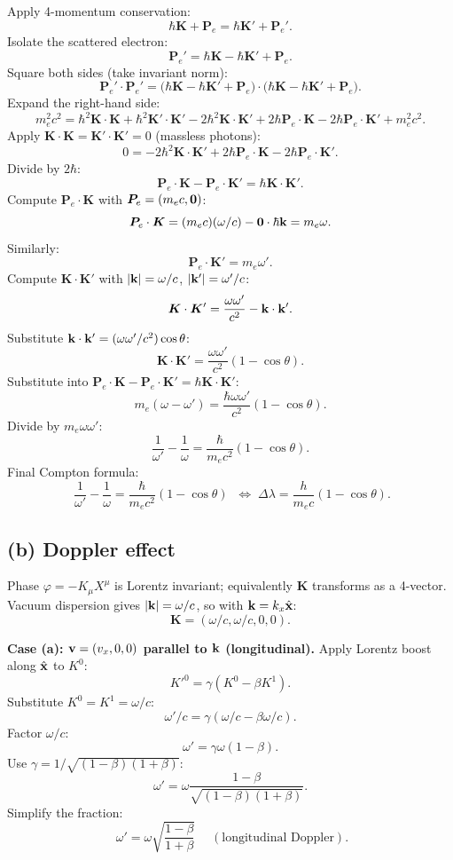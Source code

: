 \documentclass[11pt]{article}
\begin{document}
Apply 4-momentum conservation:
\[
\hbar\bm K + \bm P_e = \hbar\bm K' + \bm P_e'.
\]
Isolate the scattered electron:
\[
\bm P_e' = \hbar\bm K - \hbar\bm K' + \bm P_e.
\]
Square both sides (take invariant norm):
\[
\bm P_e'\cdot\bm P_e' = \bigl(\hbar\bm K - \hbar\bm K' + \bm P_e\bigr)\cdot\bigl(\hbar\bm K - \hbar\bm K' + \bm P_e\bigr).
\]
Expand the right-hand side:
\[
m_e^2 c^2 = \hbar^2\bm K\cdot\bm K + \hbar^2\bm K'\cdot\bm K' - 2\hbar^2\bm K\cdot\bm K' + 2\hbar\bm P_e\cdot\bm K - 2\hbar\bm P_e\cdot\bm K' + m_e^2 c^2.
\]
Apply $\bm K\cdot\bm K=\bm K'\cdot\bm K'=0$ (massless photons):
\[
0 = -2\hbar^2\bm K\cdot\bm K' + 2\hbar\bm P_e\cdot\bm K - 2\hbar\bm P_e\cdot\bm K'.
\]
Divide by $2\hbar$:
\[
\bm P_e\cdot\bm K - \bm P_e\cdot\bm K' = \hbar\bm K\cdot\bm K'.
\]
Compute $\bm P_e\cdot\bm K$ with $\bm P_e=(m_ec,\vb 0)$:
\[
\bm P_e\cdot\bm K = (m_e c)(\omega/c) - \vb 0\cdot\hbar\vb k = m_e\omega.
\]
Similarly:
\[
\bm P_e\cdot\bm K' = m_e\omega'.
\]
Compute $\bm K\cdot\bm K'$ with $|\vb k|=\omega/c$, $|\vb k'|=\omega'/c$:
\[
\bm K\cdot\bm K' = \frac{\omega\omega'}{c^2} - \vb k\cdot\vb k'.
\]
Substitute $\vb k\cdot\vb k' = (\omega\omega'/c^2)\cos\theta$:
\[
\bm K\cdot\bm K' = \frac{\omega\omega'}{c^2}(1-\cos\theta).
\]
Substitute into $\bm P_e\cdot\bm K - \bm P_e\cdot\bm K' = \hbar\bm K\cdot\bm K'$:
\[
m_e(\omega - \omega') = \frac{\hbar\omega\omega'}{c^2}(1-\cos\theta).
\]
Divide by $m_e\omega\omega'$:
\[
\frac{1}{\omega'} - \frac{1}{\omega} = \frac{\hbar}{m_e c^2}(1-\cos\theta).
\]
Final Compton formula:
\[
\boxed{\;\frac{1}{\omega'} - \frac{1}{\omega} = \frac{\hbar}{m_e c^2}(1-\cos\theta)\;}\;\Longleftrightarrow\;\Delta\lambda = \frac{h}{m_e c}(1-\cos\theta).
\]

\subsection*{(b) Doppler effect}

Phase $\varphi = -K_\mu X^\mu$ is Lorentz invariant; equivalently $\bm K$ transforms as a 4-vector. Vacuum dispersion gives $|\vb k|=\omega/c$, so with $\vb k=k_x\hat{\vb x}$:
\[
\bm K = (\omega/c,\omega/c,0,0).
\]

\textbf{Case (a): $\vb v=(v_x,0,0)$ parallel to $\vb k$ (longitudinal).}
Apply Lorentz boost along $\hat{\vb x}$ to $K^0$:
\[
K'^0 = \gamma(K^0 - \beta K^1).
\]
Substitute $K^0 = K^1 = \omega/c$:
\[
\omega'/c = \gamma(\omega/c - \beta\omega/c).
\]
Factor $\omega/c$:
\[
\omega' = \gamma\omega(1-\beta).
\]
Use $\gamma = 1/\sqrt{(1-\beta)(1+\beta)}$:
\[
\omega' = \omega\frac{1-\beta}{\sqrt{(1-\beta)(1+\beta)}}.
\]
Simplify the fraction:
\[
\boxed{\;\omega' = \omega\sqrt{\frac{1-\beta}{1+\beta}}\;}\quad(\text{longitudinal Doppler}).
\]
\end{document}
